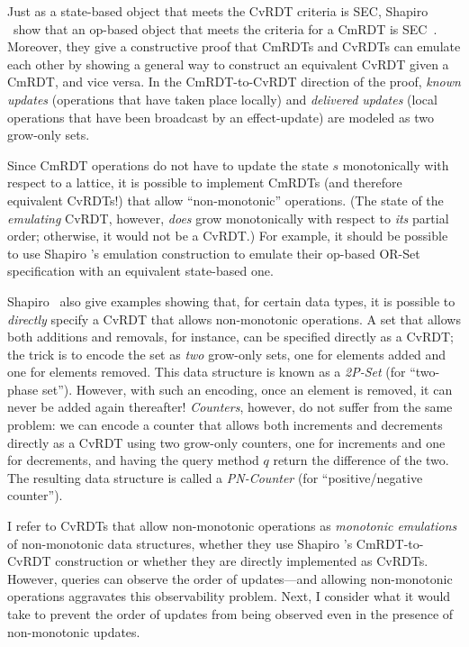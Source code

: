 \documentclass{article}
\begin{document}
Just as a state-based object that meets the CvRDT criteria is SEC,
Shapiro \etal~show that an op-based object that meets the criteria for
a CmRDT is SEC~\cite{crdts}.  Moreover, they give a constructive proof
that CmRDTs and CvRDTs can emulate each other by showing a general way
to construct an equivalent CvRDT given a CmRDT, and vice versa.  In
the CmRDT-to-CvRDT direction of the proof, \emph{known updates}
(operations that have taken place locally) and \emph{delivered
  updates} (local operations that have been broadcast by an
effect-update) are modeled as two grow-only sets.

Since CmRDT operations do not have to update the state $s$
monotonically with respect to a lattice, it is possible to implement
CmRDTs (and therefore equivalent CvRDTs!) that allow ``non-monotonic''
operations.  (The state of the \emph{emulating} CvRDT, however,
\emph{does} grow monotonically with respect to \emph{its} partial
order; otherwise, it would not be a CvRDT.) For example, it should be
possible to use Shapiro \etal's emulation construction to emulate
their op-based OR-Set specification with an equivalent state-based
one.

Shapiro \etal~also give examples showing that, for certain data types,
it is possible to \emph{directly} specify a CvRDT that allows
non-monotonic operations.  A set that allows both additions and
removals, for instance, can be specified directly as a CvRDT; the
trick is to encode the set as \emph{two} grow-only sets, one for
elements added and one for elements removed.  This data structure is
known as a \emph{2P-Set} (for ``two-phase set'').  However, with such
an encoding, once an element is removed, it can never be added again
thereafter!  \emph{Counters}, however, do not suffer from the same
problem: we can encode a counter that allows both increments and
decrements directly as a CvRDT using two grow-only counters, one for
increments and one for decrements, and having the query method $q$
return the difference of the two.  The resulting data structure is
called a \emph{PN-Counter} (for ``positive/negative counter'').

I refer to CvRDTs that allow non-monotonic operations as
\emph{monotonic emulations} of non-monotonic data structures, whether
they use Shapiro \etal's CmRDT-to-CvRDT construction or whether they
are directly implemented as CvRDTs.  However, queries can observe the
order of updates---and allowing non-monotonic operations aggravates
this observability problem.  Next, I consider what it would take to
prevent the order of updates from being observed even in the presence
of non-monotonic updates.
\end{document}
